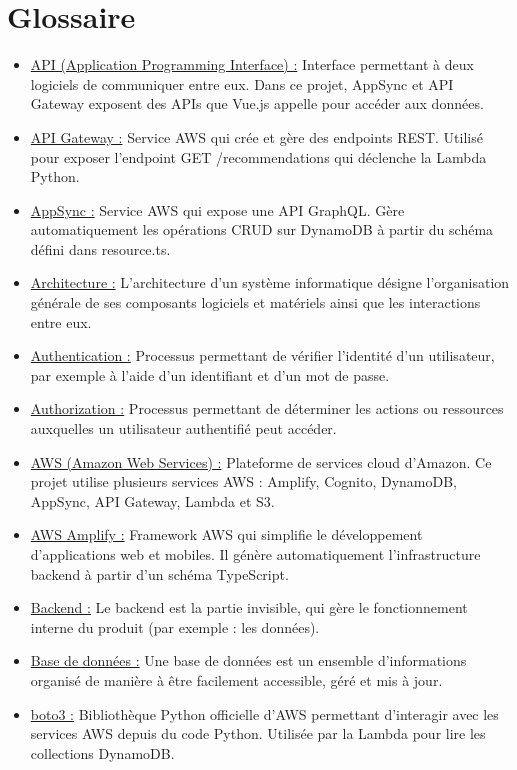 \documentclass[a4paper,12pt]{report}
\begin{document}
\chapter*{Glossaire}
\begin{itemize}
    \item \underline{API (Application Programming Interface) :} Interface permettant à deux logiciels de communiquer entre eux. Dans ce projet, AppSync et API Gateway exposent des APIs que Vue.js appelle pour accéder aux données.
    \item \underline{API Gateway :} Service AWS qui crée et gère des endpoints REST. Utilisé pour exposer l’endpoint GET /recommendations qui déclenche la Lambda Python.
    \item \underline{AppSync :} Service AWS qui expose une API GraphQL. Gère automatiquement les opérations CRUD sur DynamoDB à partir du schéma défini dans resource.ts.
    \item \underline{Architecture :} L'architecture d'un système informatique désigne l'organisation générale de ses composants logiciels et matériels ainsi que les interactions entre eux.
    \item \underline{Authentication :} Processus permettant de vérifier l’identité d’un utilisateur, par exemple à l’aide d’un identifiant et d’un mot de passe.
    \item \underline{Authorization :} Processus permettant de déterminer les actions ou ressources auxquelles un utilisateur authentifié peut accéder.
    \item \underline{AWS (Amazon Web Services) :} Plateforme de services cloud d’Amazon. Ce projet utilise plusieurs services AWS : Amplify, Cognito, DynamoDB, AppSync, API Gateway, Lambda et S3.
    \item \underline{AWS Amplify :} Framework AWS qui simplifie le développement d’applications web et mobiles. Il génère automatiquement l’infrastructure backend à partir d’un schéma TypeScript.
    \item \underline{Backend :} Le backend est la partie invisible, qui gère le fonctionnement interne du produit (par exemple : les données).
    \item \underline{Base de données :} Une base de données est un ensemble d’informations organisé de manière à être facilement accessible, géré et mis à jour.
     \item \underline{boto3 :} Bibliothèque Python officielle d’AWS permettant d’interagir avec les services AWS depuis du code Python. Utilisée par la Lambda pour lire les collections DynamoDB.

\end{itemize}
\end{document}
